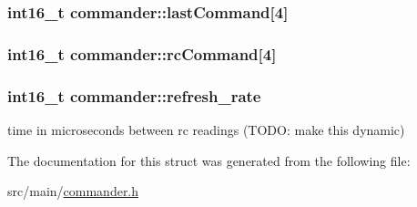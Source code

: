 \hypertarget{structcommander_af88801509d9aa119526243b345705a7e}{
\subsubsection[{last\+Command}]{\setlength{\rightskip}{0pt plus 5cm}int16\+\_\+t commander\+::last\+Command\mbox{[}4\mbox{]}}}\label{structcommander_af88801509d9aa119526243b345705a7e}
\hypertarget{structcommander_a6e769486c728fd934f8fabf8f819db2d}{
\subsubsection[{rc\+Command}]{\setlength{\rightskip}{0pt plus 5cm}int16\+\_\+t commander\+::rc\+Command\mbox{[}4\mbox{]}}}\label{structcommander_a6e769486c728fd934f8fabf8f819db2d}
\hypertarget{structcommander_a5de951c54feab6654a90f5acbaecd546}{
\subsubsection[{refresh\+\_\+rate}]{\setlength{\rightskip}{0pt plus 5cm}int16\+\_\+t commander\+::refresh\+\_\+rate}}\label{structcommander_a5de951c54feab6654a90f5acbaecd546}


time in microseconds between rc readings (T\+O\+D\+O\+: make this dynamic) 



The documentation for this struct was generated from the following file\+:\begin{DoxyCompactItemize}
\item 
src/main/\hyperlink{commander_8h}{commander.\+h}\end{DoxyCompactItemize}
